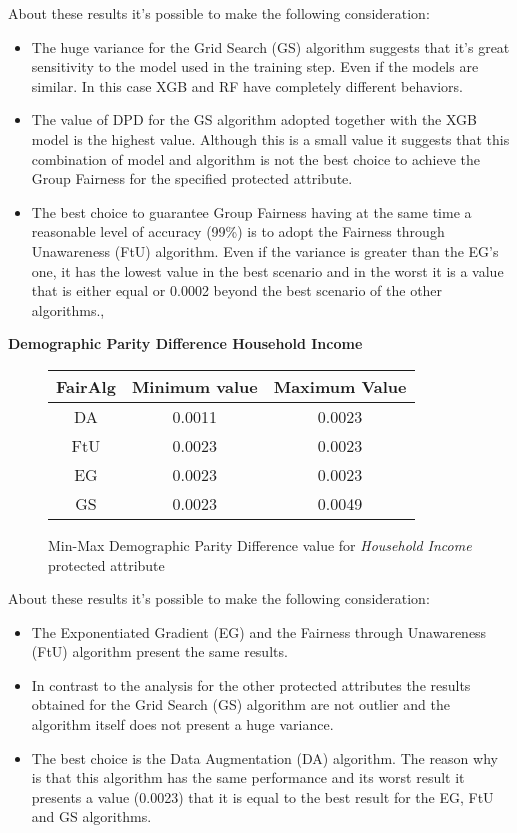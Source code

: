 About these results it's possible to make the following consideration:

\begin{itemize}
    \item The huge variance for the Grid Search (GS) algorithm suggests that it's great sensitivity to the model used in the training step. Even if the models are similar. In this case XGB and RF have completely different behaviors.

    \item The value of DPD for the GS algorithm adopted together with the XGB model is the highest value. Although this is a small value it suggests that this combination of model and algorithm is not the best choice to achieve the Group Fairness for the specified protected attribute.

    \item The best choice to guarantee Group Fairness having at the same time a reasonable level of accuracy (99\%) is to adopt the Fairness through Unawareness (FtU) algorithm. Even if the variance is greater than the EG's one, it has the lowest value in the best scenario and in the worst it is a value that is either equal or 0.0002 beyond the best scenario of the other algorithms., 
\end{itemize}

\newpage
\textbf{Demographic Parity Difference Household Income}
\begin{figure}[H]
    \centering
    \begin{tabular}{|c|c|c|}
        \hline
        \textbf{FairAlg} & \textbf{Minimum value} & \textbf{Maximum Value} \\
        \hline
        DA & 0.0011 & 0.0023 \\
        \hline
        FtU & 0.0023 & 0.0023 \\
        \hline
        EG & 0.0023 & 0.0023 \\
        \hline
        GS & 0.0023 & 0.0049 \\
        \hline
    \end{tabular}
    \caption{Min-Max Demographic Parity Difference value for \emph{Household Income} protected attribute}
\end{figure}

About these results it's possible to make the following consideration:

\begin{itemize}
    \item The Exponentiated Gradient (EG) and the Fairness through Unawareness (FtU) algorithm present the same results.

    \item In contrast to the analysis for the other protected attributes the results obtained for the Grid Search (GS) algorithm are not outlier and the algorithm itself does not present a huge variance.

    \item The best choice is the Data Augmentation (DA) algorithm. The reason why is that this algorithm has the same performance and its worst result it presents a value (0.0023) that it is equal to the best result for the EG, FtU and GS algorithms.
\end{itemize}

